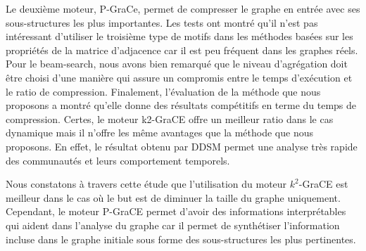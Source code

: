 	Le deuxième moteur, P-GraCe, permet de compresser le graphe en entrée avec ses sous-structures les plus importantes. Les tests ont montré qu'il n'est pas intéressant d'utiliser le troisième type de motifs dans les méthodes basées sur les propriétés de la matrice d'adjacence car il est peu fréquent dans les graphes réels. Pour le beam-search, nous avons bien remarqué que le niveau d'agrégation doit être choisi d'une manière qui assure un compromis entre le temps d'exécution et le ratio de compression. 
	Finalement, l'évaluation de la méthode que nous proposons a montré qu'elle donne des résultats compétitifs en terme du temps de compression. Certes, le moteur k2-GraCE offre un meilleur ratio dans le cas dynamique mais il n'offre les même avantages que la méthode que nous proposons. En effet, le résultat obtenu par DDSM permet une analyse très rapide des communautés et leurs comportement temporels.
	
	
	Nous constatons à travers cette étude que l'utilisation du moteur $k^2$-GraCE est meilleur dans le cas où le but est de diminuer la taille du graphe uniquement. Cependant, le moteur P-GraCE permet d'avoir des informations interprétables qui aident dans l'analyse du graphe car il permet de synthétiser l'information incluse dans le graphe initiale sous forme des sous-structures les plus pertinentes.
	
	
	
	
	
	
	
	
	
	
	
	
	
	
	
	
	
	
	
	
	
	
	
	
	
	
	